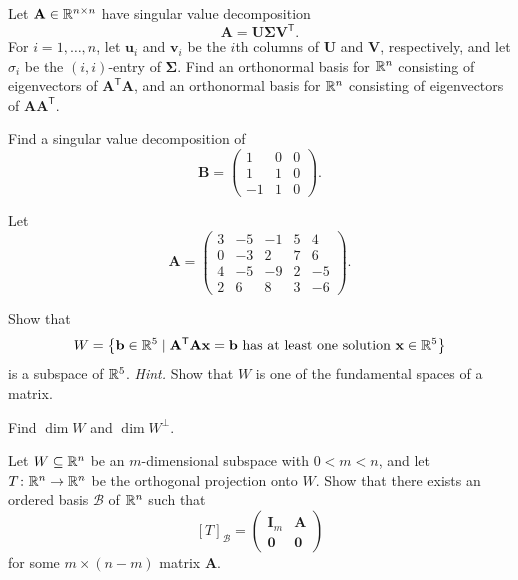 \begin{problem}
\begin{problemsubparts}
\item Let $\mathbf A\in\mathbb{R}^{n\times n}$ have singular value decomposition
\[
\mathbf A=\mathbf U\boldsymbol\Sigma\mathbf V^{\mathsf T}.
\]
For $i=1,\dots,n$, let $\mathbf u_i$ and $\mathbf v_i$ be the $i$th columns of $\mathbf U$ and $\mathbf V$, respectively, and let $\sigma_i$ be the $(i,i)$-entry of $\boldsymbol\Sigma$. Find an orthonormal basis for $\mathbb{R}^n$ consisting of eigenvectors of $\mathbf A^{\mathsf T}\mathbf A$, and an orthonormal basis for $\mathbb{R}^n$ consisting of eigenvectors of $\mathbf A\mathbf A^{\mathsf T}$.
\item Find a singular value decomposition of
\[
\mathbf B=
\begin{pmatrix}
1&0&0\\
1&1&0\\
-1&1&0
\end{pmatrix}.
\]
\end{problemsubparts}
\end{problem}

\begin{problem}
Let
\[
\mathbf A=
\begin{pmatrix}
3&-5&-1&5&4\\
0&-3&2&7&6\\
4&-5&-9&2&-5\\
2&6&8&3&-6
\end{pmatrix}.
\]
\begin{problemsubparts}
\item Show that
\[
W=\left\{\mathbf b\in\mathbb{R}^5\mid \mathbf A^{\mathsf T}\mathbf A\mathbf x=\mathbf b
\text{ has at least one solution }\mathbf x\in\mathbb{R}^5\right\}
\]
is a subspace of $\mathbb{R}^5$. \textit{Hint.} Show that $W$ is one of the fundamental spaces of a matrix.
\item Find $\dim W$ and $\dim W^\perp$.
\end{problemsubparts}
\end{problem}

\begin{problem}
Let $W\subseteq\mathbb{R}^n$ be an $m$-dimensional subspace with $0<m<n$, and let $T\colon\mathbb{R}^n\to\mathbb{R}^n$ be the orthogonal projection onto $W$. Show that there exists an ordered basis $\mathcal B$ of $\mathbb{R}^n$ such that
\[
[T]_{\mathcal B}=
\begin{pmatrix}
\mathbf I_m&\mathbf A\\
\mathbf0&\mathbf0
\end{pmatrix}
\]
for some $m\times(n-m)$ matrix $\mathbf A$.
\end{problem}

